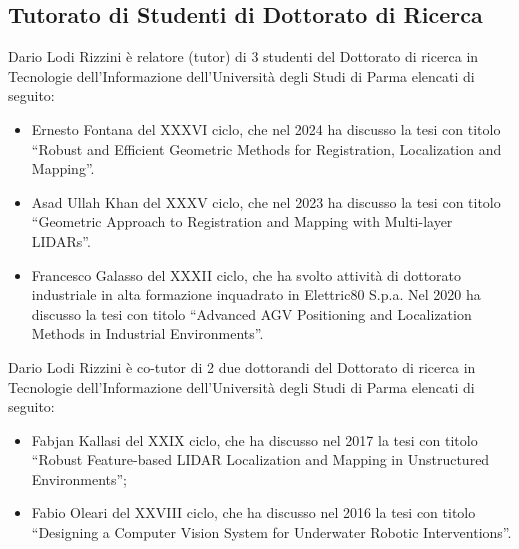 \documentclass[11pt]{article}
\begin{document}
\begin{itemize}

\section*{Tutorato di Studenti di Dottorato di Ricerca}

Dario Lodi Rizzini \`e relatore (tutor) di 3 studenti del Dottorato di ricerca in Tecnologie dell'Informazione dell'Universit\`a degli Studi di Parma elencati di seguito:
\begin{itemize}
\item Ernesto Fontana del XXXVI ciclo, che nel 2024 ha discusso la tesi con titolo ``Robust and Efficient Geometric Methods for Registration, Localization and Mapping''.
\item Asad Ullah Khan del XXXV ciclo, che nel 2023 ha discusso la tesi con titolo ``Geometric Approach to Registration and Mapping with Multi-layer LIDARs''.
\item Francesco Galasso del XXXII ciclo, che ha svolto attivit\`a di dottorato industriale in alta formazione inquadrato in Elettric80 S.p.a. 
  Nel 2020 ha discusso la tesi con titolo ``Advanced AGV Positioning and Localization Methods in Industrial Environments''.
\end{itemize}
%
\vspace{3mm}
%
Dario Lodi Rizzini \`e co-tutor di 2 due dottorandi del Dottorato di ricerca in Tecnologie dell'Informazione dell'Universit\`a degli Studi di Parma elencati di seguito:
\begin{itemize}
\item Fabjan Kallasi del XXIX ciclo, che ha discusso nel 2017 la tesi con titolo ``Robust Feature-based LIDAR Localization and Mapping in Unstructured Environments'';
\item Fabio Oleari del XXVIII ciclo, che ha discusso nel 2016 la tesi con titolo ``Designing a Computer Vision System for Underwater Robotic Interventions''.
\end{itemize}




\end{itemize}
\end{document}
